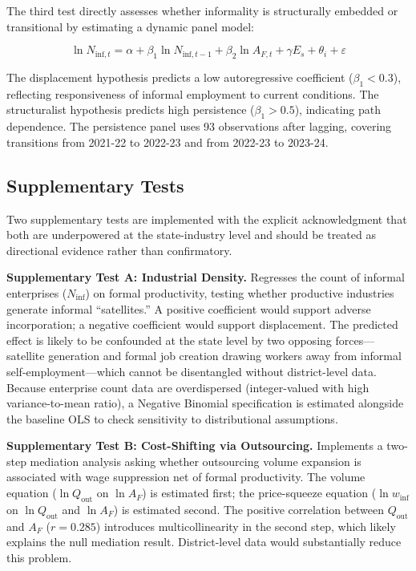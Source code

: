 The third test directly assesses whether informality is structurally embedded or transitional by estimating a dynamic panel model:

\begin{equation}
	\ln N_{\text{inf},t} = \alpha + \beta_1 \ln N_{\text{inf},t-1} + \beta_2 \ln A_{F,t} + \gamma E_s + \theta_i + \varepsilon
\end{equation}

The displacement hypothesis predicts a low autoregressive coefficient ($\beta_1 < 0.3$), reflecting responsiveness of informal employment to current conditions. The structuralist hypothesis predicts high persistence ($\beta_1 > 0.5$), indicating path dependence. The persistence panel uses 93 observations after lagging, covering transitions from 2021-22 to 2022-23 and from 2022-23 to 2023-24.

\subsection{Supplementary Tests}

Two supplementary tests are implemented with the explicit acknowledgment that both are underpowered at the state-industry level and should be treated as directional evidence rather than confirmatory.

\textbf{Supplementary Test A: Industrial Density.} Regresses the count of informal enterprises ($N_{\text{inf}}$) on formal productivity, testing whether productive industries generate informal ``satellites.'' A positive coefficient would support adverse incorporation; a negative coefficient would support displacement. The predicted effect is likely to be confounded at the state level by two opposing forces---satellite generation and formal job creation drawing workers away from informal self-employment---which cannot be disentangled without district-level data. Because enterprise count data are overdispersed (integer-valued with high variance-to-mean ratio), a Negative Binomial specification is estimated alongside the baseline OLS to check sensitivity to distributional assumptions.

\textbf{Supplementary Test B: Cost-Shifting via Outsourcing.} Implements a two-step mediation analysis asking whether outsourcing volume expansion is associated with wage suppression net of formal productivity. The volume equation ($\ln Q_{\text{out}}$ on $\ln A_F$) is estimated first; the price-squeeze equation ($\ln w_{\text{inf}}$ on $\ln Q_{\text{out}}$ and $\ln A_F$) is estimated second. The positive correlation between $Q_{\text{out}}$ and $A_F$ ($r = 0.285$) introduces multicollinearity in the second step, which likely explains the null mediation result. District-level data would substantially reduce this problem.

